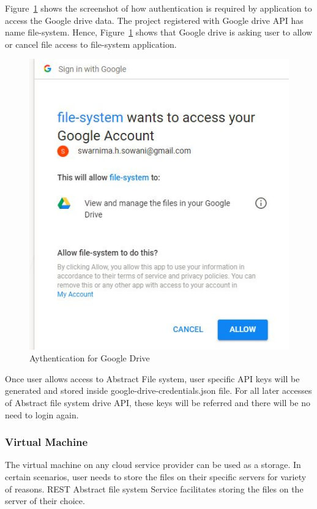 Figure~\ref{fig:auth} shows the screenshot of how authentication is 
required by application to access the Google drive data. 
The project registered with Google drive API has name file-system. 
Hence, Figure~\ref{fig:auth} shows that Google drive is asking user 
to allow or cancel file access to file-system application. 

\begin{figure}[!ht]
        \centering\includegraphics[width=\columnwidth]
        {image/auth.JPG}
        \caption{Aythentication for Google Drive}\label{fig:auth}
\end{figure}


Once user allows access to Abstract File system, user specific API
keys will be generated and stored inside google-drive-credentials.json
file.  For all later accesses of Abstract file system drive API, these
keys will be referred and there will be no need to login again.


\subsubsection{Virtual Machine}


The virtual machine on any cloud service provider can be used as a
storage. In certain scenarios, user needs to store the files on their
specific servers for variety of reasons. REST Abstract file system 
Service facilitates storing the files on the server of their choice.

